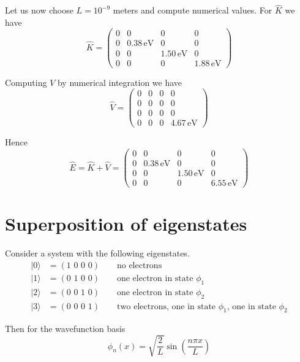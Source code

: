 \documentclass[12pt]{article}
\begin{document}
\noindent
Let us now choose $L=10^{-9}$ meters and compute numerical values.
For $\hat{K}$ we have
\begin{equation*}
\hat{K}=\begin{pmatrix}
0 & 0 & 0 & 0\\
0 & 0.38\,\text{eV} & 0 & 0\\
0 & 0 & 1.50\,\text{eV} & 0\\
0 & 0 & 0 & 1.88\,\text{eV}
\end{pmatrix}
\end{equation*}

\noindent
Computing $V$ by numerical integration we have
\begin{equation*}
\hat{V}=\begin{pmatrix}
0 & 0 & 0 & 0\\
0 & 0 & 0 & 0\\
0 & 0 & 0 & 0\\
0 & 0 & 0 & 4.67\,\text{eV}
\end{pmatrix}
\end{equation*}

\noindent
Hence
\begin{equation*}
\hat{E}=\hat{K}+\hat{V}=\begin{pmatrix}
0 & 0 & 0 & 0\\
0 & 0.38\,\text{eV} & 0 & 0\\
0 & 0 & 1.50\,\text{eV} & 0\\
0 & 0 & 0 & 6.55\,\text{eV}
\end{pmatrix}
\end{equation*}

\newpage

\section{Superposition of eigenstates}
Consider a system with the following eigenstates.
\begin{align*}
|0\rangle&=(\text{1 0 0 0})\qquad\text{no electrons}\\
|1\rangle&=(\text{0 1 0 0})\qquad\text{one electron in state $\phi_1$}\\
|2\rangle&=(\text{0 0 1 0})\qquad\text{one electron in state $\phi_2$}\\
|3\rangle&=(\text{0 0 0 1})\qquad\text{two electrons, one in state $\phi_1$, one in state $\phi_2$}
\end{align*}

\noindent
Then for the wavefunction basis
\begin{equation*}
\phi_n(x)=\sqrt{\frac{2}{L}}\sin\left(\frac{n\pi x}{L}\right)
\end{equation*}
\end{document}
